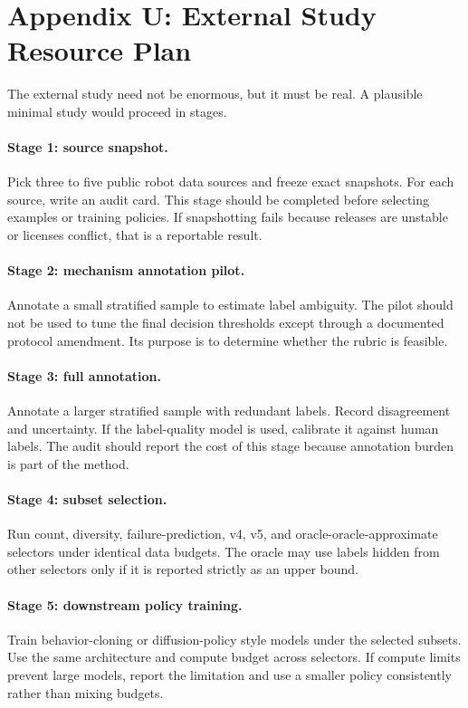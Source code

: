\documentclass{article}
\begin{document}
\section{Appendix U: External Study Resource Plan}
The external study need not be enormous, but it must be real. A plausible minimal study would proceed in stages.

\paragraph{Stage 1: source snapshot.}
Pick three to five public robot data sources and freeze exact snapshots. For each source, write an audit card. This stage should be completed before selecting examples or training policies. If snapshotting fails because releases are unstable or licenses conflict, that is a reportable result.

\paragraph{Stage 2: mechanism annotation pilot.}
Annotate a small stratified sample to estimate label ambiguity. The pilot should not be used to tune the final decision thresholds except through a documented protocol amendment. Its purpose is to determine whether the rubric is feasible.

\paragraph{Stage 3: full annotation.}
Annotate a larger stratified sample with redundant labels. Record disagreement and uncertainty. If the label-quality model is used, calibrate it against human labels. The audit should report the cost of this stage because annotation burden is part of the method.

\paragraph{Stage 4: subset selection.}
Run count, diversity, failure-prediction, v4, v5, and oracle-oracle-approximate selectors under identical data budgets. The oracle may use labels hidden from other selectors only if it is reported strictly as an upper bound.

\paragraph{Stage 5: downstream policy training.}
Train behavior-cloning or diffusion-policy style models under the selected subsets. Use the same architecture and compute budget across selectors. If compute limits prevent large models, report the limitation and use a smaller policy consistently rather than mixing budgets.
\end{document}
